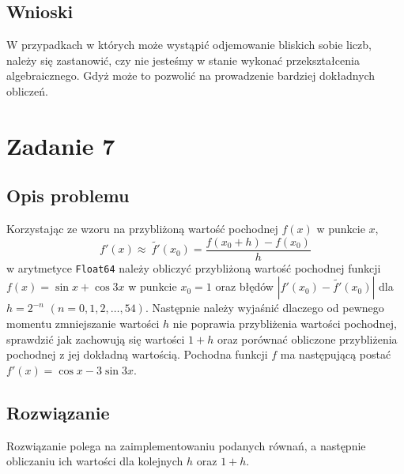 \documentclass{article}
\begin{document}
\begin{center}
    \subsection{Wnioski}
    \large W przypadkach w których może wystąpić odjemowanie bliskich sobie liczb, należy się zastanowić, 
     czy nie jesteśmy w stanie wykonać przekształcenia algebraicznego. Gdyż może to pozwolić na prowadzenie bardziej dokładnych obliczeń. 
    \section{Zadanie 7}
    \subsection{Opis problemu}
    \large Korzystając ze wzoru na przybliżoną wartość pochodnej \(f(x)\) w punkcie \(x\),
     \[\displaystyle f'(x) \approx\ \tilde{f'}(x_{0}) = \frac{f(x_{0} + h) - f(x_{0})}{h}\]
     w arytmetyce \texttt{Float64} należy obliczyć przybliżoną wartość pochodnej funkcji \(f(x) = \sin x + \cos 3x\) w punkcie \(x_{0}=1\) 
     oraz błędów \(|f'(x_{0}) - \tilde{f'}(x_{0})|\) dla \(h = 2^{-n}\) \((n = 0,1,2,\ldots,54)\). \newline
     Następnie należy wyjaśnić dlaczego od pewnego momentu zmniejszanie wartości \(h\) 
     nie poprawia przybliżenia wartości pochodnej, sprawdzić jak zachowują się wartości \(1 + h\) 
     oraz porównać obliczone przybliżenia pochodnej z jej dokładną wartością.
     Pochodna funkcji \(f\) ma następującą postać \(f'(x) = \cos x - 3\sin 3x\).
    \subsection{Rozwiązanie}
    \large Rozwiązanie polega na zaimplementowaniu podanych równań, a następnie obliczaniu ich wartości dla kolejnych \(h\) oraz \(1 + h\).

\end{center}
\end{document}
